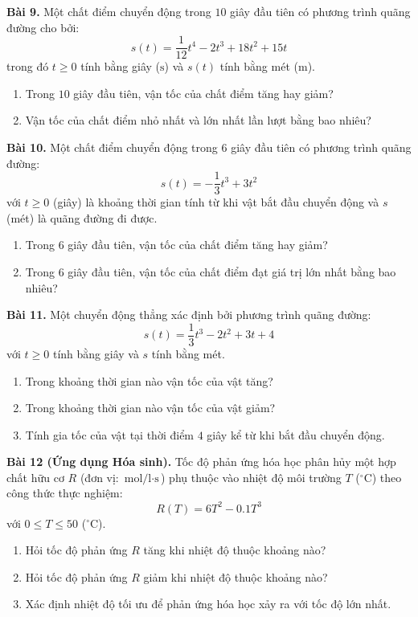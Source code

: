 \documentclass[12pt]{article}
\begin{document}
	\begin{btdo}
		\textbf{Bài 9.} Một chất điểm chuyển động trong $10$ giây đầu tiên có phương trình quãng đường cho bởi:
		$$s(t) = \dfrac{1}{12}t^4 - 2t^3 + 18t^2 + 15t$$
		trong đó $t \ge 0$ tính bằng giây ($\text{s}$) và $s(t)$ tính bằng mét ($\text{m}$).
		\begin{enumerate}[label=\alph*)]
			\item Trong $10$ giây đầu tiên, vận tốc của chất điểm tăng hay giảm?
			\item Vận tốc của chất điểm nhỏ nhất và lớn nhất lần lượt bằng bao nhiêu?
		\end{enumerate}
		
		\textbf{Bài 10.} Một chất điểm chuyển động trong $6$ giây đầu tiên có phương trình quãng đường:
		$$s(t) = -\dfrac{1}{3}t^3 + 3t^2$$
		với $t \ge 0$ (giây) là khoảng thời gian tính từ khi vật bắt đầu chuyển động và $s$ (mét) là quãng đường đi được.
		\begin{enumerate}[label=\alph*)]
			\item Trong $6$ giây đầu tiên, vận tốc của chất điểm tăng hay giảm?
			\item Trong $6$ giây đầu tiên, vận tốc của chất điểm đạt giá trị lớn nhất bằng bao nhiêu?
		\end{enumerate}
		
		\textbf{Bài 11.} Một chuyển động thẳng xác định bởi phương trình quãng đường:
		$$s(t) = \dfrac{1}{3}t^3 - 2t^2 + 3t + 4$$
		với $t \ge 0$ tính bằng giây và $s$ tính bằng mét.
		\begin{enumerate}[label=\alph*)]
			\item Trong khoảng thời gian nào vận tốc của vật tăng?
			\item Trong khoảng thời gian nào vận tốc của vật giảm?
			\item Tính gia tốc của vật tại thời điểm $4$ giây kể từ khi bắt đầu chuyển động.
		\end{enumerate}
		
		\textbf{Bài 12 (Ứng dụng Hóa sinh).} Tốc độ phản ứng hóa học phân hủy một hợp chất hữu cơ $R$ (đơn vị: $\text{mol/l}\cdot\text{s}$) phụ thuộc vào nhiệt độ môi trường $T$ ($^\circ\text{C}$) theo công thức thực nghiệm:
		$$R(T) = 6T^2 - 0.1T^3$$
		với $0 \le T \le 50$ ($^\circ\text{C}$).
		\begin{enumerate}[label=\alph*)]
			\item Hỏi tốc độ phản ứng $R$ tăng khi nhiệt độ thuộc khoảng nào?
			\item Hỏi tốc độ phản ứng $R$ giảm khi nhiệt độ thuộc khoảng nào?
			\item Xác định nhiệt độ tối ưu để phản ứng hóa học xảy ra với tốc độ lớn nhất.
		\end{enumerate}
	\end{btdo}
	
\end{document}
